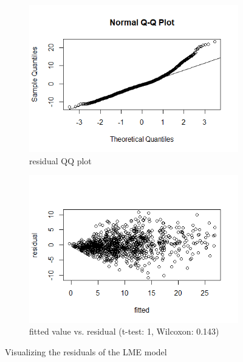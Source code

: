 \begin{figure}[H]
\begin{subfigure}{.5\textwidth}
  \centering
  \includegraphics[width=1\linewidth]{../../plots/qq_residual.png}
  \caption{residual QQ plot}
\end{subfigure}
\begin{subfigure}{.5\textwidth}
  \centering
  \includegraphics[width=1\linewidth]{../../plots/residual.png}
  \caption{fitted value vs. residual (t-test: 1, Wilcoxon: 0.143)}
\end{subfigure}
\caption{Visualizing the residuals of the LME model}
\label{fig:residual}
\end{figure}

